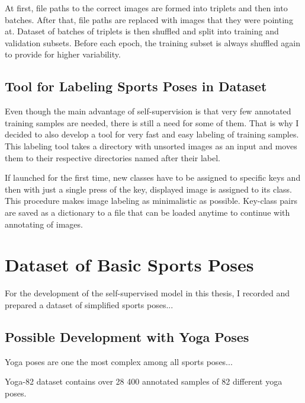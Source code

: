 At first, file paths to the correct images are formed into triplets and then into batches. After that, file paths are replaced with images that they were pointing at. Dataset of batches of triplets is then shuffled and split into training and validation subsets. Before each epoch, the training subset is always shuffled again to provide for higher variability.

\subsection{\label{sec:dataset-label-tool}Tool for Labeling Sports Poses in Dataset}

Even though the main advantage of self-supervision is that very few annotated training samples are needed, there is still a need for some of them. That is why I decided to also develop a tool for very fast and easy labeling of training samples. This labeling tool takes a directory with unsorted images as an input and moves them to their respective directories named after their label.

If launched for the first time, new classes have to be assigned to specific keys and then with just a single press of the key, displayed image is assigned to its class. This procedure makes image labeling as minimalistic as possible. Key-class pairs are saved as a dictionary to a file that can be loaded anytime to continue with annotating of images.

\section{\label{sec:basic-dataset}Dataset of Basic Sports Poses}

For the development of the self-supervised model in this thesis, I recorded and prepared a dataset of simplified sports poses...
\blindtext

\blindtext

\blindtext

\blindtext

\subsection{Possible Development with Yoga Poses}

Yoga poses are one the most complex among all sports poses...
\blindtext

Yoga-82 dataset contains over 28 400 annotated samples of 82 different yoga poses.
\blindtext

\blindtext

\blindtext

\blindtext
